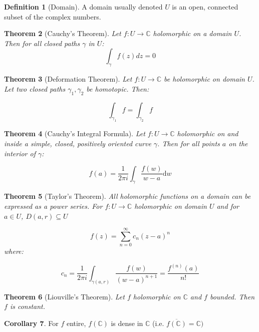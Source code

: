 \documentclass[11pt,a4paper, titlepage]{article}
\newtheorem{theorem}{Theorem}[section]
\theoremstyle{definition}
\newtheorem{definition}[theorem]{Definition}
\newtheorem{corollary}[theorem]{Corollary}
\begin{document}
\begin{definition}[Domain]
A domain usually denoted $U$ is an open, connected subset of the complex numbers.
\end{definition}

\begin{theorem}[Cauchy's Theorem]

Let $f \colon U \longrightarrow \mathbb{C}$ holomorphic on a domain $U$. Then for all closed paths $\gamma$ in $U$:
\[
	\int_\gamma f(z) dz = 0
\]

\end{theorem}

\begin{theorem}[Deformation Theorem]

Let $f \colon U \longrightarrow \mathbb{C}$ be holomorphic on domain $U$. Let two closed paths $\gamma_1, \gamma_2 $ be homotopic. Then:

\[
	\int_{\gamma_1} f = \int_{\gamma_2} f
\]	

\end{theorem}

\begin{theorem}[Cauchy's Integral Formula]

Let $f \colon U \longrightarrow \mathbb{C}$ holomorphic on and inside a simple, closed, positively oriented curve $\gamma$. Then for all points $a$ on the interior of $\gamma$:

\[
	f(a) = \frac{1}{2\pi i} \int_\gamma \frac{f(w)}{w-a} \mathrm{d}w
\]	

\end{theorem}

\begin{theorem}[Taylor's Theorem]

All holomorphic functions on a domain can be expressed as a power series. For $f \colon U \longrightarrow \mathbb{C}$ holomorphic on domain $U$ and for $a \in U$, $D(a,r) \subseteq U$

\[
	f(z) = 	\sum_{n=0}^\infty c_n (z-a)^n
\]
where:

\[
	c_n = \frac{1}{2 \pi i} \int_{\gamma(a,r)} \frac{f(w)}{(w-a)^{n+1}} = \frac{f^{(n)}(a)}{n!}
\]
\end{theorem}


\begin{theorem}[Liouville's Theorem]
Let $f$ holomorphic on $\mathbb{C}$ and $f$ bounded. Then $f$ is constant.
\end{theorem}

\begin{corollary}
For $f$ entire, $f(\mathbb{C})$ is dense in $\mathbb{C}$ (i.e. $\overline {f(\mathbb{C})} = \mathbb{C})$
\end{corollary}
\end{document}
